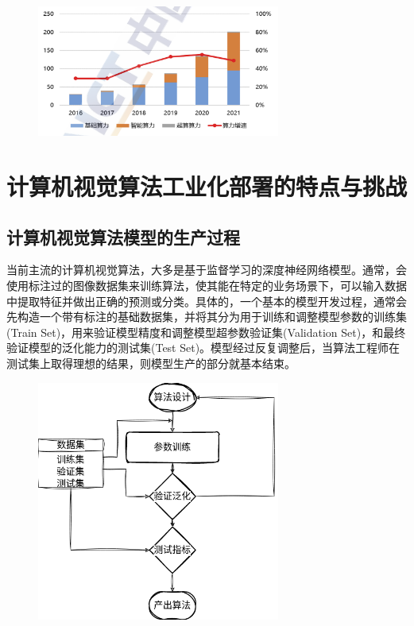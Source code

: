 \documentclass[master]{shtthesis}
\begin{document}
\begin{figure}[htbp]
	\centering
	\includegraphics[width=8cm]{img/1.png}
	\label{2022年中国算力发展状况}
\end{figure}

\section{计算机视觉算法工业化部署的特点与挑战}\label{计算机视觉算法工业化部署的特点与挑战}
\subsection{计算机视觉算法模型的生产过程}\label{计算机视觉算法模型的生产过程}
当前主流的计算机视觉算法，大多是基于监督学习的深度神经网络模型。通常，会使用标注过的图像数据集来训练算法，使其能在特定的业务场景下，可以输入数据中提取特征并做出正确的预测或分类。具体的，一个基本的模型开发过程，通常会先构造一个带有标注的基础数据集，并将其分为用于训练和调整模型参数的训练集(Train Set)，用来验证模型精度和调整模型超参数验证集(Validation Set)，和最终验证模型的泛化能力的测试集(Test Set)。模型经过反复调整后，当算法工程师在测试集上取得理想的结果，则模型生产的部分就基本结束。

\begin{figure}[htbp]
	\centering
	\includegraphics[width=8cm]{img/2.png}
	\label{计算机视觉算法模型的生产过程}
\end{figure}
\end{document}
